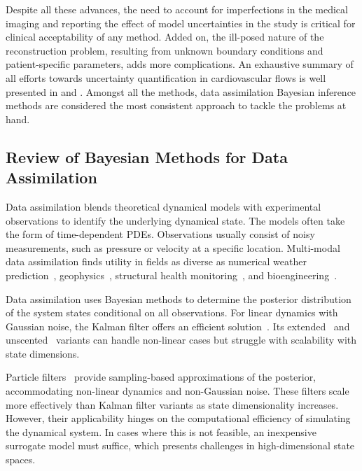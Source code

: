 Despite all these advances, the need to account for imperfections in the medical imaging and reporting the effect of model uncertainties in the study is critical for clinical acceptability of any method. Added on, the ill-posed nature of the reconstruction problem, resulting from unknown boundary conditions and patient-specific parameters, adds more complications. An exhaustive summary of all efforts towards uncertainty quantification in cardiovascular flows is well presented in \cite{Arzani2022_CardioML} and \cite{Ninos2018_HemoUQ}. Amongst all the methods, data assimilation Bayesian inference methods are considered the most consistent approach to tackle the problems at hand.

\subsection{Review of Bayesian Methods for Data Assimilation}

Data assimilation blends theoretical dynamical models with experimental observations to identify the underlying dynamical state. 
The models often take the form of time-dependent PDEs.
Observations usually consist of noisy measurements, such as pressure or velocity at a specific location.
Multi-modal data assimilation finds utility in fields as diverse as numerical weather prediction~\cite{xue_advanced_2003}, geophysics~\cite{petra_computational_2014}, structural health monitoring~\cite{Chatzi2009, Maes2018, Yang2007, Chatzi2010}, and bioengineering~\cite{raissi_hidden_2020,rajendran_uncertainty_2020,zhang2019_4Dpressure,meyers_development_2018}.

Data assimilation uses Bayesian methods to determine the posterior distribution of the system states conditional on all observations.
For linear dynamics with Gaussian noise, the Kalman filter offers an efficient solution~\cite{Kalman1960}.
Its extended~\cite{Sorenson1966, Schmidt1981} and unscented~\cite{Julier1995, LUND2020106512} variants can handle non-linear cases but struggle with scalability with state dimensions.

Particle filters~\cite{Gordon1993, Doucet2001, Cappe2007} provide sampling-based approximations of the posterior, accommodating non-linear dynamics and non-Gaussian noise.
These filters scale more effectively than Kalman filter variants as state dimensionality increases. 
However, their applicability hinges on the computational efficiency of simulating the dynamical system. 
In cases where this is not feasible, an inexpensive surrogate model must suffice, which presents challenges in high-dimensional state spaces.

